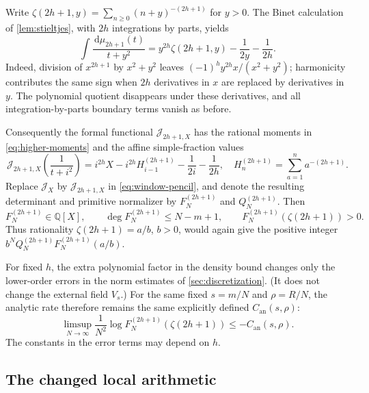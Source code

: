 \documentclass[11pt,letterpaper]{article}
\theoremstyle{definition}
\newcommand{\Q}{\mathbb Q}
\newcommand{\dd}{\,\mathrm d}
\newcommand{\J}{\mathcal J}
\newcommand{\an}{\mathrm{an}}
\begin{document}
Write $\zeta(2h+1,y)=\sum_{n\ge0}(n+y)^{-(2h+1)}$ for $y>0$.
The Binet calculation of \cref{lem:stieltjes}, with $2h$ integrations
by parts, yields
\begin{equation}\label{eq:higher-stieltjes}
 \int\frac{\dd\mu_{2h+1}(t)}{t+y^2}
 =y^{2h}\zeta(2h+1,y)-\frac1{2y}-\frac1{2h}.
\end{equation}
Indeed, division of $x^{2h+1}$ by $x^2+y^2$ leaves
$(-1)^hy^{2h}x/(x^2+y^2)$; harmonicity contributes the same sign
when $2h$ derivatives in $x$ are replaced by derivatives in $y$.
The polynomial quotient disappears under these derivatives, and all
integration-by-parts boundary terms vanish as before.

Consequently the formal functional $\J_{2h+1,X}$ has the rational moments
in \eqref{eq:higher-moments} and the affine simple-fraction values
\begin{equation}\label{eq:higher-affine}
 \J_{2h+1,X}\!\left(\frac1{t+i^2}\right)
 =i^{2h}X-i^{2h}H_{i-1}^{(2h+1)}-\frac1{2i}-\frac1{2h},
 \quad H_n^{(2h+1)}=\sum_{a=1}^n a^{-(2h+1)}.
\end{equation}
Replace $\J_X$ by $\J_{2h+1,X}$ in \eqref{eq:window-pencil}, and denote
the resulting determinant and primitive normalizer by $F_N^{(2h+1)}$ and
$Q_N^{(2h+1)}$. Then
\[
 F_N^{(2h+1)}\in\Q[X],\qquad
 \deg F_N^{(2h+1)}\le N-m+1,\qquad
 F_N^{(2h+1)}(\zeta(2h+1))>0.
\]
Thus rationality $\zeta(2h+1)=a/b$, $b>0$, would again give the positive
integer $b^NQ_N^{(2h+1)}F_N^{(2h+1)}(a/b)$.

For fixed $h$, the extra polynomial factor in the density bound changes
only the lower-order errors in the norm estimates of
\cref{sec:discretization}. (It does not change the external field $V_s$.)
For the same fixed $s=m/N$ and $\rho=R/N$, the analytic rate therefore
remains the same explicitly defined $C_{\an}(s,\rho)$:
\begin{equation}\label{eq:higher-analytic-rate}
 \limsup_{N\to\infty}\frac1{N^2}
   \log F_N^{(2h+1)}(\zeta(2h+1))\le-C_{\an}(s,\rho).
\end{equation}
The constants in the error terms may depend on $h$.

\subsection{The changed local arithmetic}
\end{document}

